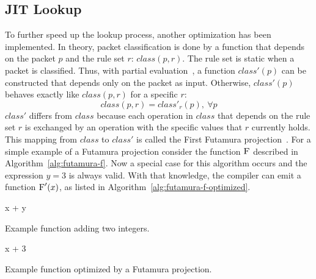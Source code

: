 \documentclass[conference]{IEEEtran}
\begin{document}
\subsection{JIT Lookup}
To further speed up the lookup process, another optimization has been implemented.
In theory, packet classification is done by a function that depends on the packet $p$ and the rule set $r$: $class(p, r)$.
The rule set is static when a packet is classified.
Thus, with partial evaluation~\cite{partial_eval}, a function $class'(p)$ can be constructed that depends only on the packet as input.
Otherwise, $class'(p)$ behaves exactly like $class(p, r)$ for a specific $r$:
$$class(p, r) = class'_r(p),\ \forall p$$
$class'$ differs from $class$ because each operation in $class$ that depends on the 
rule set $r$ is exchanged by an operation with the specific values that $r$ currently holds.
This mapping from $class$ to $class'$ is called the First Futamura projection~\cite{DBLP:journals/ngc/MogensenH88}.
For a simple example of a Futamura projection consider the function $\textsc{F}$ described in Algorithm~\ref{alg:futamura-f}.
Now a special case for this algorithm occurs and the expression $y = 3$ is always valid.
With that knowledge, the compiler can emit a function $\textsc{F}'(x)$, as listed in Algorithm~\ref{alg:futamura-f-optimized}.

\begin{algorithm}
\begin{algorithmic}[1]
    \State \Return x + y
\EndFunction
\end{algorithmic}
\caption{Example function adding two integers.}
\label{alg:futamura-f}
\end{algorithm}

\vspace{-0.5cm}

\begin{algorithm}
\begin{algorithmic}[1]
    \State \Return x + 3
\EndFunction
\end{algorithmic}
\caption{Example function optimized by a Futamura projection.}
\label{alg:futamura-f-optimized}
\end{algorithm}
\end{document}
